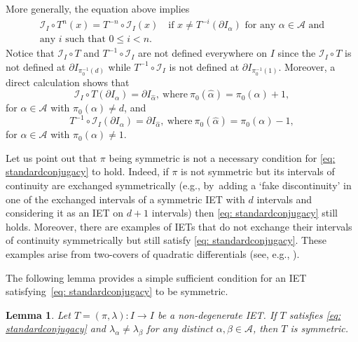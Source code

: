 \documentclass[JEP,XML,SOM,Unicode,NoEqCountersInSection,NoFloatCountersInSection,published]{cedram}
\theoremstyle{plain}
\newtheorem{lemma}[theorem]{Lemma}
\theoremstyle{definition}
\newcommand{\A}{\mathcal{A}}
\newcommand{\I}{\mathcal{I}}
\begin{document}
\pagebreak[2]
More generally, the equation above implies
\begin{multline}
\label{eq:generalized_conjugacy}
\mathcal{I}_I\circ T^n(x)=T^{-n}\circ\mathcal{I}_I(x) \quad \text{if } x \neq T^{-i}(\partial I_\alpha) \text{ for any } \alpha \in \A \text{ and}\\ \text{any $i$ such that } 0 \leq i < n.
\end{multline}
{Notice that $\I_I\circ T$ and $T^{-1}\circ \I_I$ are not defined everywhere on $I$ since the $\I_I\circ T$ is not defined at $\partial I_{\pi_0^{-1}(d)}$ while $T^{-1}\circ \I_I$ is not defined at $\partial I_{\pi_0^{-1}(1)}$.}
Moreover, {a direct calculation shows that}
\begin{equation}
\label{eq:sym_identity_endpoints}
\I_I\circ T(\partial I_{\alpha})=\partial I_{\hat\alpha},\ \text{where}\ \pi_0(\hat\alpha)=\pi_0(\alpha)+1,
\end{equation}
for $\alpha\in\A$ with $\pi_0(\alpha)\neq d$, and
\begin{equation}\label{eq:sym_identity_endpoints_2}
T^{-1}\circ \I_I(\partial I_{\alpha})=\partial I_{\hat\alpha},\ \text{where}\ \pi_0(\hat\alpha)=\pi_0(\alpha)-1,
\end{equation}
for $\alpha\in\A$ with $\pi_0(\alpha)\neq 1$.

Let us point out that $\pi$ being symmetric is not a necessary condition for \eqref{eq: standardconjugacy} to hold. Indeed, if $\pi$ is not symmetric but its intervals of continuity are exchanged symmetrically {(e.g., by~adding a `fake discontinuity' in one of the exchanged intervals of a symmetric IET with $d$ intervals and considering it as an IET on $d + 1$ intervals)} then \eqref{eq: standardconjugacy} still holds. Moreover, there are examples of IETs that do not exchange their intervals of continuity symmetrically but still satisfy \eqref{eq: standardconjugacy}. These examples arise from two-covers of quadratic differentials {(see, e.g., \cite{boissy_dynamics_2009}}).

The following lemma provides a simple sufficient condition for an IET satisfying~\eqref{eq: standardconjugacy} to be symmetric.

\begin{lemma}
\label{lem: condition for symmetric iets,}
Let $T=(\pi,\lambda): I \to I$ be a non-degenerate IET. If $T$ satisfies
\eqref{eq: standardconjugacy}
and $\lambda_{\alpha}\neq \lambda_{\beta}$ for any distinct $\alpha, \beta \in \mathcal{A}$, then $T$ is symmetric.
\end{lemma}
\end{document}
